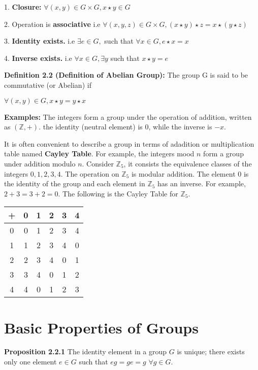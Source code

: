 \documentclass[12pt,openany]{book}
\theoremstyle{definition}
\theoremstyle{definition}
\begin{document}
1. \textbf{Closure:} $\forall (x,y) \in G \times G, x \star y \in G $

2. Operation is \textbf{associative} i.e $\forall (x, y, z) \in G \times G, (x \star y) \star z = x \star (y \star z) $

3. \textbf{Identity exists.} i.e $\exists e \in G,$ such that $\forall x \in G, e \star x = x $

4. \textbf{Inverse exists.} i.e $\forall x \in G, \exists y$ such that $x \star y = e$

\noindent\textbf{Definition 2.2 (Definition of Abelian Group):} The group G is said to be commutative (or Abelian) if 

$\forall (x,y) \in G, x \star y = y \star x$

\noindent\textbf{Examples:} The integers  form a group under the operation of addition, written as $(\mathbb{Z}, +)$. the identity (neutral element) is $0$, while the inverse is $-x$.

\noindent It is often convenient to describe a group in terms of adadition or multiplication table named \textbf{Cayley Table}. For example, the integers mood $n$ form a group under addition modulo $n$. Consider $\mathbb{Z}_5$, it consists the equivalence classes of the integers $0,1,2,3,4$. The operation on $\mathbb{Z}_5$ is modular addition. The element $0$ is the identity of the group and each element in $\mathbb{Z}_5$ has an inverse. For example, $2+3 = 3+2 = 0$. The following is the Cayley Table for $\mathbb{Z}_5$.

\begin{center}
\begin{tabular}{ |c|c|c|c|c|c| } 
\hline
+ & 0 & 1 & 2 & 3 & 4 \\
\hline
0 & 0 & 1 & 2 & 3 & 4 \\ 
1 & 1 & 2 & 3 & 4 & 0 \\ 
2 & 2 & 3 & 4 & 0 & 1 \\ 
3 & 3 & 4 & 0 & 1 & 2 \\ 
4 & 4 & 0 & 1 & 2 & 3 \\
\hline
\end{tabular}
\end{center}

\section{Basic Properties of Groups}

\textbf{Proposition 2.2.1} The identity element in a group $G$ is unique; there exists only one element $e \in G$ such that $eg = ge = g $ $\forall g \in G$.
\end{document}
